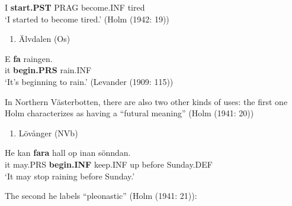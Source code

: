 I  \textbf{start.PST} PRAG  become.INF  tired\\ %


‘I started to become tired.’ (Holm (1942: 19))
\z

\begin{enumerate} %
\item 
Älvdalen (Os) 

\end{enumerate} %
\ea\label{}
\gll E  \textbf{fa} raingen.\\


it  \textbf{begin.PRS} rain.INF\\ %


‘It’s beginning to rain.’ (Levander (1909: 115))
\z

In Northern Västerbotten, there are also two other kinds of uses: the first one Holm characterizes as having a “futural meaning” (Holm (1941: 20))

\begin{enumerate} %
\item 
\label{bkm:Ref72064267}Lövånger (NVb)

\end{enumerate} %
\ea\label{}
\gll He  kan  \textbf{fara} hall  op  inan  sönndan.\\


it  may.PRS  \textbf{begin.INF} keep.INF  up  before  Sunday.DEF\\ %


 ‘It may stop raining before Sunday.’
\z


The second he labels “pleonastic” (Holm (1941: 21)):


